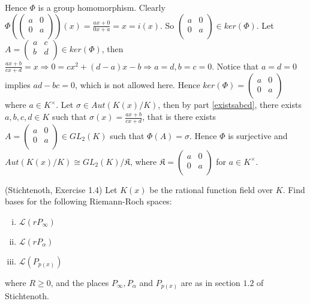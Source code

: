 \begin{solution}
\begin{enumerate}[(i)]
\noindent Hence $\Phi$ is a group homomorphism. Clearly
$\Phi(\begin{pmatrix} a & 0 \\ 0 & a \\ \end{pmatrix})(x) = \frac{ax + 0}{0x +a} = x = i(x)$. 
So $\begin{pmatrix} a & 0 \\ 0 & a \\ \end{pmatrix} \in ker(\Phi)$. 
Let $A = \begin{pmatrix} a & c \\ b & d \\ \end{pmatrix} \in ker(\Phi)$, 
then $\frac{ax+b}{cx + d} = x \Rightarrow 0 = cx^2 + (d-a)x - b \Rightarrow a = d, b = c = 0$. 
Notice that $a=d = 0$ implies $ad - bc = 0$, which is not allowed here. 
Hence $ker(\Phi) = \begin{pmatrix} a & 0 \\ 0 & a \\ \end{pmatrix} $ 
where $a \in K^{\times}$. Let $\sigma \in Aut(K(x)/K)$, 
then by part \eqref{existsabcd}, there exists $a,b,c,d \in K$ such that 
$\sigma(x) = \frac{ax+b}{cx+d}$, that is there exists 
$A = \begin{pmatrix} a & 0 \\ 0 & a \\ \end{pmatrix} \in GL_2(K)$ such that 
$\Phi(A) = \sigma$. Hence $\Phi$ is surjective and $Aut(K(x)/K) \cong GL_2(K)/\mathfrak{K}$,
where $\mathfrak{K} = \begin{pmatrix} a & 0 \\ 0 & a \\ \end{pmatrix}$ for $a \in K^{\times}$.

\end{enumerate}
\end{solution}
    

\begin{exercise}(Stichtenoth, Exercise 1.4)
Let $K(x)$ be the rational function field over $K$. Find 
bases for the following Riemann-Roch spaces: 
\begin{enumerate}[(i)]
\item \label{infinity} 		$\mathscr{L}(rP_{\infty})$
\item \label{linear}   		$\mathscr{L}(rP_{\alpha})$
\item \label{irreducible11} 	$\mathscr{L}(P_{p(x)})$
\end{enumerate}
where $R \geq 0$, and the places $P_{\infty}, P_{\alpha}$ and $P_{p(x)}$
are as in section $1.2$ of Stichtenoth. 
\end{exercise}

